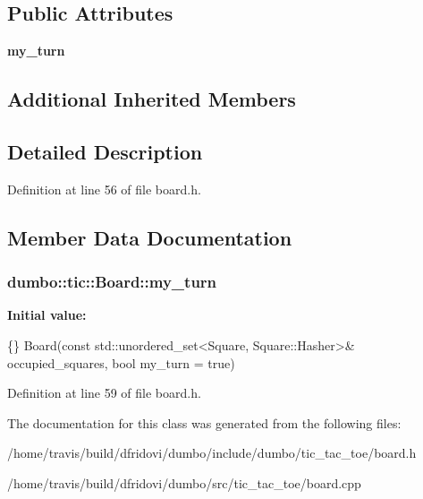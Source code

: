 \subsection*{Public Attributes}
\begin{DoxyCompactItemize}
\item 
{\bfseries my\-\_\-turn}
\end{DoxyCompactItemize}
\subsection*{Additional Inherited Members}


\subsection{Detailed Description}


Definition at line 56 of file board.\-h.



\subsection{Member Data Documentation}
\hypertarget{classdumbo_1_1tic_1_1_board_a1a2d7a8b6a19d97fabf37a51a31d9ff4}{
\subsubsection[{my\-\_\-turn}]{\setlength{\rightskip}{0pt plus 5cm}dumbo\-::tic\-::\-Board\-::my\-\_\-turn}}\label{classdumbo_1_1tic_1_1_board_a1a2d7a8b6a19d97fabf37a51a31d9ff4}
{\bfseries Initial value\-:}
\begin{DoxyCode}
\{\}
  Board(\textcolor{keyword}{const} std::unordered\_set<Square, Square::Hasher>& occupied\_squares,
        \textcolor{keywordtype}{bool} my\_turn = \textcolor{keyword}{true})
\end{DoxyCode}


Definition at line 59 of file board.\-h.



The documentation for this class was generated from the following files\-:\begin{DoxyCompactItemize}
\item 
/home/travis/build/dfridovi/dumbo/include/dumbo/tic\-\_\-tac\-\_\-toe/board.\-h\item 
/home/travis/build/dfridovi/dumbo/src/tic\-\_\-tac\-\_\-toe/board.\-cpp\end{DoxyCompactItemize}
